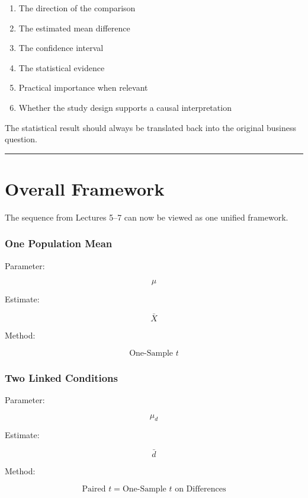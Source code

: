\documentclass[
  letterpaper,
  DIV=11,
  numbers=noendperiod]{scrreprt}
\providecommand{\tightlist}{%
  \setlength{\itemsep}{0pt}\setlength{\parskip}{0pt}}
\begin{document}
\begin{enumerate}
\def\labelenumi{\arabic{enumi}.}
\tightlist
\item
  The direction of the comparison
\item
  The estimated mean difference
\item
  The confidence interval
\item
  The statistical evidence
\item
  Practical importance when relevant
\item
  Whether the study design supports a causal interpretation
\end{enumerate}

The statistical result should always be translated back into the
original business question.

\begin{center}\rule{0.5\linewidth}{0.5pt}\end{center}


\chapter{Overall Framework}\label{overall-framework-1}

The sequence from Lectures 5--7 can now be viewed as one unified
framework.

\subsection{One Population Mean}\label{one-population-mean}

Parameter:

\[
\mu
\]

Estimate:

\[
\bar{X}
\]

Method:

\[
\text{One-Sample }t
\]

\subsection{Two Linked Conditions}\label{two-linked-conditions}

Parameter:

\[
\mu_d
\]

Estimate:

\[
\bar{d}
\]

Method:

\[
\text{Paired }t
=
\text{One-Sample }t\text{ on Differences}
\]
\end{document}
